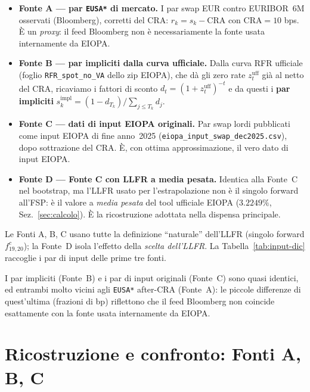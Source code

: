 \documentclass[11pt,a4paper]{article}
\theoremstyle{definition}
\theoremstyle{remark}
\newcommand{\CRA}{\mathrm{CRA}}
\begin{document}
\begin{itemize}
  \item \textbf{Fonte A --- par \texttt{EUSA*} di mercato.} I par swap EUR contro EURIBOR~6M
        osservati (Bloomberg), corretti del $\CRA$: $r_k = s_k - \CRA$ con $\CRA=10$ bps.
        \`E un \emph{proxy}: il feed Bloomberg non \`e necessariamente la fonte usata
        internamente da EIOPA.
  \item \textbf{Fonte B --- par impliciti dalla curva ufficiale.} Dalla curva RFR ufficiale
        (foglio \texttt{RFR\_spot\_no\_VA} dello zip EIOPA), che d\`a gli zero rate
        $z_t^{\text{uff}}$ gi\`a al netto del CRA, ricaviamo i fattori di sconto
        $d_t=(1+z_t^{\text{uff}})^{-t}$ e da questi i \textbf{par impliciti}
        $s_k^{\text{impl}}=(1-d_{T_k})/\sum_{j\le T_k}d_j$.
  \item \textbf{Fonte C --- dati di input EIOPA originali.} Par swap lordi pubblicati come
        input EIOPA di fine anno~2025 (\texttt{eiopa\_input\_swap\_dec2025.csv}), dopo sottrazione del
        $\CRA$. \`E, con ottima approssimazione, il vero dato di input EIOPA.
  \item \textbf{Fonte D --- Fonte C con LLFR a media pesata.} Identica alla Fonte~C nel
        bootstrap, ma l'LLFR usato per l'estrapolazione non \`e il singolo forward all'FSP:
        \`e il valore a \emph{media pesata} del tool ufficiale EIOPA ($3.2249\%$,
        Sez.~\ref{sec:calcolo}). \`E la ricostruzione adottata nella dispensa principale.
\end{itemize}

Le Fonti A, B, C usano tutte la definizione ``naturale'' dell'LLFR (singolo forward
$f^c_{19,20}$); la Fonte~D isola l'effetto della \emph{scelta dell'LLFR}. La
Tabella~\ref{tab:input-dic} raccoglie i par di input delle prime tre fonti.



I par impliciti (Fonte~B) e i par di input originali (Fonte~C) sono quasi identici, ed
entrambi molto vicini agli \texttt{EUSA*} after-CRA (Fonte~A): le piccole differenze di
quest'ultima (frazioni di bp) riflettono che il feed Bloomberg non coincide esattamente con
la fonte usata internamente da EIOPA.

\section{Ricostruzione e confronto: Fonti A, B, C}
\label{sec:abc}
\end{document}
